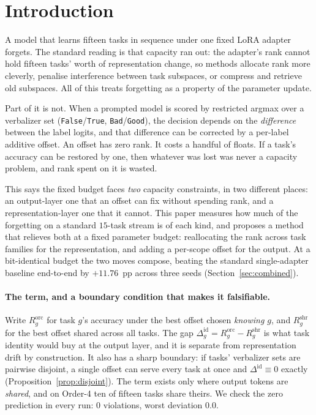 \section{Introduction}
\label{sec:introduction}

A model that learns fifteen tasks in sequence under one fixed LoRA adapter forgets.
The standard reading is that capacity ran out: the adapter's rank cannot hold
fifteen tasks' worth of representation change, so methods allocate rank more
cleverly, penalise interference between task subspaces, or compress and retrieve old
subspaces. All of this treats forgetting as a property of the parameter update.

Part of it is not. When a prompted model is scored by restricted argmax over a
verbalizer set (\texttt{False}/\texttt{True}, \texttt{Bad}/\texttt{Good}), the
decision depends on the \emph{difference} between the label logits, and that
difference can be corrected by a per-label additive offset. An offset has zero rank.
It costs a handful of floats. If a task's accuracy can be restored by one, then
whatever was lost was never a capacity problem, and rank spent on it is wasted.

This says the fixed budget faces \emph{two} capacity constraints, in two different
places: an output-layer one that an offset can fix without spending rank, and a
representation-layer one that it cannot. This paper measures how much of the
forgetting on a standard $15$-task stream is of each kind, and proposes a method that
relieves both at a fixed parameter budget: reallocating the rank across task
families for the representation, and adding a per-scope offset for the output. At a
bit-identical budget the two moves compose, beating the standard single-adapter
baseline end-to-end by $+11.76$~pp across three seeds (Section~\ref{sec:combined}).

\paragraph{The term, and a boundary condition that makes it falsifiable.}
Write $R_g^{\mathrm{orc}}$ for task $g$'s accuracy under the best offset chosen
\emph{knowing $g$}, and $R_g^{\mathrm{shr}}$ for the best offset shared across all
tasks. The gap $\Delta^{\mathrm{id}}_g = R_g^{\mathrm{orc}} - R_g^{\mathrm{shr}}$ is
what task identity would buy at the output layer, and it is separate from
representation drift by construction. It also has a sharp boundary: if tasks'
verbalizer sets are pairwise disjoint, a single offset can serve every task at once
and $\Delta^{\mathrm{id}} \equiv 0$ exactly (Proposition~\ref{prop:disjoint}). The
term exists only where output tokens are \emph{shared}, and on Order-4 ten of
fifteen tasks share theirs. We check the zero prediction in every run: $0$
violations, worst deviation $0.0$.

